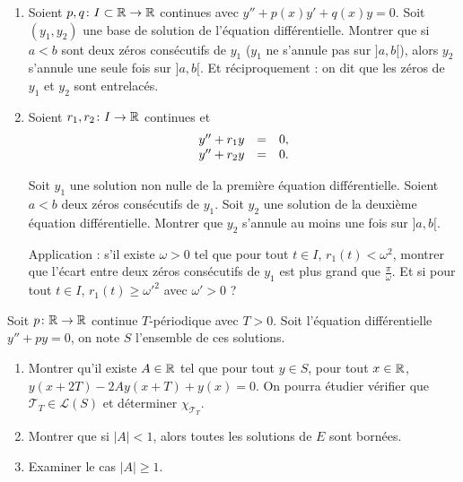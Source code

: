\documentclass[12pt]{article}
\begin{document}
\begin{exercise}
	\phantom{}
	\begin{enumerate}
		\item Soient $p,q\colon I\subset\mathbb{R}\to\mathbb{R}$ continues avec $y''+p(x)y'+q(x)y=0$. Soit $(y_1,y_2)$ une base de solution de l'équation différentielle. Montrer que si $a<b$ sont deux zéros consécutifs de $y_1$ ($y_1$ ne s'annule pas sur $]a,b[$), alors $y_2$ s'annule une seule fois sur $]a,b[$. Et réciproquement : on dit que les zéros de $y_1$ et $y_2$ sont entrelacés.
		
		\item Soient $r_1,r_2\colon I\to\mathbb{R}$ continues et 
		\begin{equation}
			\begin{array}[]{rcl}
				y''+r_1 y&=&0,\\
				y''+r_2 y&=&0.
			\end{array}
		\end{equation}

		Soit $y_1$ une solution non nulle de la première équation différentielle. Soient $a<b$ deux zéros consécutifs de $y_1$. Soit $y_2$ une solution de la deuxième équation différentielle. Montrer que $y_2$ s'annule au moins une fois sur $]a,b[$.

		Application : s'il existe $\omega>0$ tel que pour tout $t\in I$, $r_1(t)<\omega^{2}$, montrer que l'écart entre deux zéros consécutifs de $y_1$ est plus grand que $\frac{\pi}{\omega}$. Et si pour tout $t\in I$, $r_1(t)\geqslant\omega'^{2}$ avec $\omega'>0$ ?
	\end{enumerate}
\end{exercise}

\begin{exercise}
	Soit $p\colon\mathbb{R}\to\mathbb{R}$ continue $T$-périodique avec $T>0$. Soit l'équation différentielle $y''+py=0$, on note $S$ l'ensemble de ces solutions.
	\begin{enumerate}
		\item Montrer qu'il existe $A\in\mathbb{R}$ tel que pour tout $y\in S$, pour tout $x\in\mathbb{R}$, $y(x+2T)-2Ay(x+T)+y(x)=0$. On pourra étudier 
		vérifier que $\mathcal{T}_T\in\mathcal{L}(S)$ et déterminer $\chi_{\mathcal{T}_T}$.

		\item Montrer que si $\left\lvert A\right\rvert<1$, alors toutes les solutions de $E$ sont bornées.
		\item Examiner le cas $\left\lvert A\right\rvert\geqslant1$.
	\end{enumerate}
\end{exercise}
\end{document}
